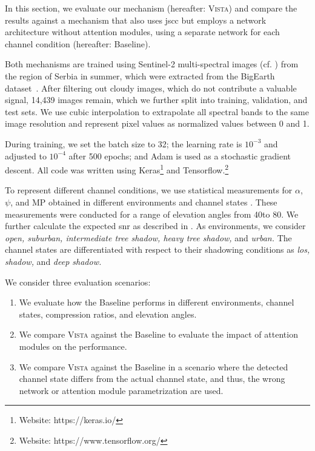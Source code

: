 \documentclass[conference]{IEEEtran}
\newcommand\MP{\ensuremath{\mathrm{MP}}\xspace}
\newcommand\ours{\textsc{Vista}\xspace}
\newcommand\baseline{Baseline\xspace}
\newcommand\sentinelii{Sentinel-2\xspace}
\begin{document}
In this section, we evaluate our mechanism (hereafter: \ours) and compare the results against a mechanism that also uses \ac{jscc} but employs a network architecture without attention modules, using a separate network for each channel condition (hereafter: \baseline).

Both mechanisms are trained using \sentinelii multi-spectral images (cf. ) from the region of Serbia in summer, which were extracted from the BigEarth dataset~\cite{sumbul2019bigearthnet,Sumbul2021}.
After filtering out cloudy images, which do not contribute a valuable signal, 14,439 images remain, which we further split into training, validation, and test sets.
We use cubic interpolation to extrapolate all spectral bands to the same image resolution and represent pixel values as normalized values between 0 and 1.

During training, we set the batch size to 32; the learning rate is $10^{-3}$ and adjusted to $10^{-4}$ after 500 epochs; and Adam is used as a stochastic gradient descent.
All code was written using Keras\footnote{Website: https://keras.io/} and Tensorflow.\footnote{Website: https://www.tensorflow.org/}

To represent different channel conditions, we use statistical measurements for $\alpha$, $\psi$, and \MP obtained in different environments and channel states \cite{channel_values}.
These measurements were conducted for a range of elevation angles from 40\textdegree to 80\textdegree.
We further calculate the expected \ac{snr} as described in .
As environments, we consider \emph{open, suburban, intermediate tree shadow, heavy tree shadow,} and \emph{urban.}
The channel states are differentiated with respect to their shadowing conditions as \emph{\acf{los}, shadow,} and \emph{deep shadow.}

We consider three evaluation scenarios:
%
\begin{enumerate}
  \item We evaluate how the \baseline performs in different environments, channel states, compression ratios, and elevation angles.
  \item We compare \ours against the \baseline to evaluate the impact of attention modules on the performance.
  \item We compare \ours against the \baseline in a scenario where the detected channel state differs from the actual channel state, and thus, the wrong network or attention module parametrization are used.
\end{enumerate}
\end{document}
